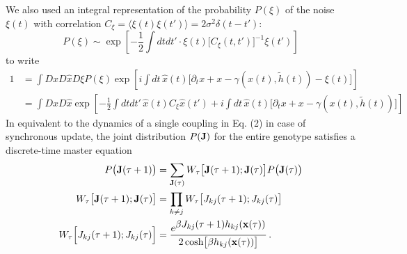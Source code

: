 \documentclass[%
 reprint,
superscriptaddress,
 amsmath,amssymb,
 prl,
]{revtex4-2}
\begin{document}
 We also used an integral representation of the probability $P(\xi)$ of the noise $\xi(t)$ with correlation $C_{\xi} =\langle \xi(t)\xi(t')\rangle = 2 \sigma^2\delta(t-t')$:
 $$P(\xi) \sim \exp\left[-\displaystyle\frac{1}{2} \int dt  dt'  \cdot\xi(t)\big[C_{\xi}(t,t')\big]^{-1} \xi(t') \right]$$
to write
\begin{align} \nonumber
1 &= \int Dx D\hat{x} D \xi P(\xi) \exp\left[ i \int dt\,  \hat{x}(t)\big[\partial_t x +x - \gamma(x(t), \tilde{h}(t)) - \xi(t) \big] \right] \\ \nonumber &= \int Dx D\hat{x} \exp\left[-\displaystyle\frac{1}{2} \int dt dt'\,  \hat{x}(t)C_{\xi}\hat{x}(t')+  i \int dt\,  \hat{x}(t)\big[\partial_t x +x - \gamma(x(t), \tilde{h}(t))  \big] \right]
\end{align}
 In equivalent to the dynamics of a single coupling in Eq. (2) %
 in case of synchronous update, the joint distribution $P(\bold{J})$ for the entire genotype satisfies a discrete-time master equation 
 \begin{align} \nonumber
P\big(\mathbf{J}(\tau+1)\big) &= \sum_{\mathbf{J}(\tau)} W_{\tau}\big[\mathbf{J}(\tau+1); \mathbf{J}(\tau)\big] P\big(\mathbf{J}(\tau)\big) 
\\ \nonumber W_{\tau}\big[\mathbf{J}(\tau+1); \mathbf{J}(\tau)\big] &= \prod_{k\neq j} W_{\tau}\big[J_{kj}(\tau+1); J_{kj}(\tau)\big] \\
   W_{\tau}\Big[J_{kj}(\tau+1); J_{kj}(\tau)\Big] & =  \frac{ e^{\displaystyle \beta J_{kj}(\tau+1)  h_{kj}(\mathbf{x}(\tau))}}{2 \, {\rm cosh}\big[\beta h_{kj}(\mathbf{x}(\tau)) \big]}\,.
\label{master_equation}
\end{align}
\end{document}
